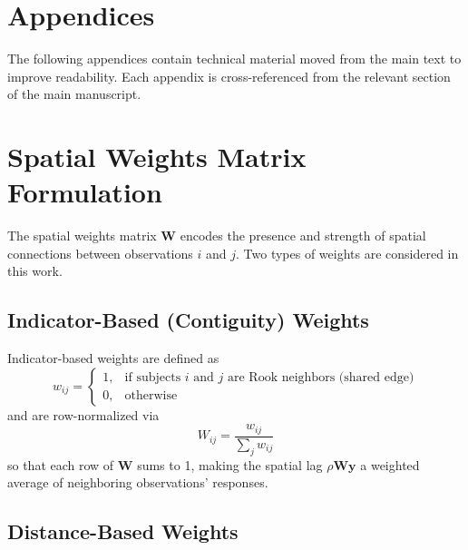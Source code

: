 \documentclass{article}[11pt]
\begin{document}
\section*{Appendices}
\vspace{0.5em}
\noindent The following appendices contain technical material moved from the main text to improve readability. Each appendix is cross-referenced from the relevant section of the main manuscript.
\vspace{1em}

\section{Spatial Weights Matrix Formulation}\label{appendix:SpatialWeights}

The spatial weights matrix $\mathbf{W}$ encodes the presence and strength of spatial connections between observations $i$ and $j$. Two types of weights are considered in this work.

\subsection*{Indicator-Based (Contiguity) Weights}

Indicator-based weights are defined as
\begin{equation}
    w_{ij} =
    \begin{cases}
        1, & \text{if subjects $i$ and $j$ are Rook neighbors (shared edge)}\\
        0, & \text{otherwise}
    \end{cases}
\end{equation}
and are row-normalized via
\begin{equation}
    W_{ij} = \frac{w_{ij}}{\displaystyle\sum_{j} w_{ij}}
\end{equation}
so that each row of $\mathbf{W}$ sums to 1, making the spatial lag $\rho\mathbf{Wy}$ a weighted average of neighboring observations' responses.

\subsection*{Distance-Based Weights}
\end{document}
